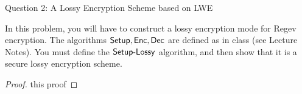 \begin{solution}{Question 2: A Lossy Encryption Scheme based on LWE}\label{ques:2}
    \begin{question}
    In this problem, you will have to construct a lossy encryption mode for Regev
encryption. The algorithms $\mathsf{Setup}, \mathsf{Enc}, \mathsf{Dec}$ are defined as in class (see Lecture Notes).
You must define the $\mathsf{Setup\text{-}Lossy}$ algorithm, and then show that it is a secure lossy
encryption scheme.
    \end{question}
    \tcblower{}
    \begin{proof}
    this proof
    \end{proof}
\end{solution}
